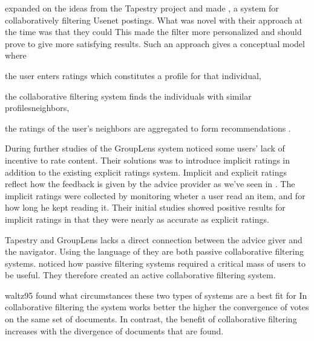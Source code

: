 \citet{resnick94} expanded on the ideas from the Tapestry project and made
,
a system for collaboratively filtering Usenet postings. What was novel with
their approach at the time was that they could
This made the filter more personalized and should prove to give more
satisfying results. Such an approach gives a conceptual model where
\begin{inparaenum}[(i)]
  \item the user enters ratings which constitutes a profile
    for that individual,
  \item the collaborative filtering system finds
    the individuals with similar profiles\dash{}neighbors,
  \item the ratings of the user's neighbors are aggregated
    to form recommendations \citep[]{herlocker00}.
\end{inparaenum}

During further studies of the GroupLens system \citet[]{konstan97}
noticed some users' lack of incentive to rate content. Their solutions
was to introduce implicit ratings in addition to the existing explicit ratings
system. Implicit and explicit ratings reflect how the feedback is given by the
advice provider as we've seen in
.
The implicit ratings were collected by monitoring wheter a user read
an item, and for how long he kept reading it. Their initial studies showed
positive results for implicit ratings in that they were nearly as accurate as
explicit ratings.

Tapestry and GroupLens lacks a direct connection
between the advice giver and the navigator. Using the language of
\citet{dieberger97} they are both passive collaborative filtering systems.
\citet{maltz95} noticed how passive filtering systems required a
critical mass of users to be useful. They therefore created an active
collaborative filtering system.
\begin{fullquote}{waltz95}{%
  found what circumstances these two types of systems are a best fit for}
    In  collaborative filtering the system works better the higher
    the convergence of votes on the same set of documents. In contrast, the
    benefit of  collaborative filtering increases with the
    divergence of documents that are found.
\end{fullquote}

